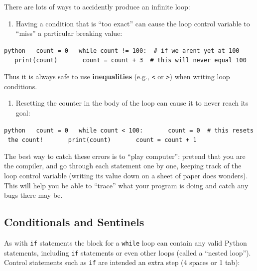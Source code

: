 \documentclass[]{book}
\providecommand{\tightlist}{%
  \setlength{\itemsep}{0pt}\setlength{\parskip}{0pt}}
\begin{document}
There are lots of ways to accidently produce an infinite loop:

\begin{enumerate}
\def\labelenumi{\arabic{enumi}.}
\tightlist
\item
  Having a condition that is ``too exact'' can cause the loop control
  variable to ``miss'' a particular breaking value:
\end{enumerate}

\texttt{python\ \ \ count\ =\ 0\ \ \ while\ count\ !=\ 100:\ \ \#\ if\ we\ aren\textquotesingle{}t\ yet\ at\ 100\ \ \ \ \ \ \ print(count)\ \ \ \ \ \ \ count\ =\ count\ +\ 3\ \ \#\ this\ will\ never\ equal\ 100}

Thus it is always safe to use \textbf{inequalities} (e.g.,
\texttt{\textless{}} or \texttt{\textgreater{}}) when writing loop
conditions.

\begin{enumerate}
\def\labelenumi{\arabic{enumi}.}
\setcounter{enumi}{1}
\tightlist
\item
  Resetting the counter in the body of the loop can cause it to never
  reach its goal:
\end{enumerate}

\texttt{python\ \ \ count\ =\ 0\ \ \ while\ count\ \textless{}\ 100:\ \ \ \ \ \ \ count\ =\ 0\ \ \#\ this\ resets\ the\ count!\ \ \ \ \ \ \ print(count)\ \ \ \ \ \ \ count\ =\ count\ +\ 1}

The best way to catch these errors is to ``play computer'': pretend that
you are the compiler, and go through each statement one by one, keeping
track of the loop control variable (writing its value down on a sheet of
paper does wonders). This will help you be able to ``trace'' what your
program is doing and catch any bugs there may be.

\hypertarget{conditionals-and-sentinels}{\subsection{Conditionals and
Sentinels}\label{conditionals-and-sentinels}}

As with \texttt{if} statements the block for a \texttt{while} loop can
contain any valid Python statements, including \texttt{if} statements or
even other loops (called a ``nested loop''). Control statements such as
\texttt{if} are intended an extra step (4 spaces or 1 tab):
\end{document}
